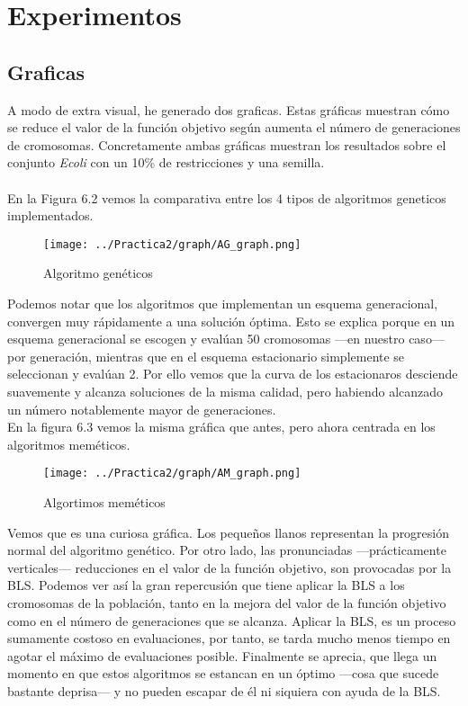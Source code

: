 \newpage

\section{Experimentos}
\subsection{Graficas}
A modo de extra visual, he generado dos graficas. Estas gráficas muestran cómo se reduce el valor de la función objetivo según aumenta el número de generaciones de cromosomas. Concretamente ambas gráficas muestran los resultados sobre el conjunto \emph{Ecoli} con un 10\% de restricciones y una semilla.\\
\\
En la Figura 6.2 vemos la comparativa entre los 4 tipos de algoritmos geneticos implementados.
\begin{figure}[H]
   \centering
   \texttt{[image: ../Practica2/graph/AG\_graph.png]}
   \caption{Algoritmo genéticos}
\end{figure}
Podemos notar que los algoritmos que implementan un esquema generacional, convergen muy rápidamente a una solución óptima. Esto se explica porque en un esquema generacional se escogen y evalúan 50 cromosomas ---en nuestro caso--- por generación, mientras que en el esquema estacionario simplemente se seleccionan y evalúan 2. Por ello vemos que la curva de los estacionaros desciende suavemente y alcanza soluciones de la misma calidad, pero habiendo alcanzado un número notablemente mayor de generaciones.\\
\newpage
En la figura 6.3 vemos la misma gráfica que antes, pero ahora centrada en los algoritmos meméticos.
\begin{figure}[H]
   \centering
   \texttt{[image: ../Practica2/graph/AM\_graph.png]}
   \caption{Algortimos meméticos}
\end{figure}

Vemos que es una curiosa gráfica. Los pequeños llanos representan la progresión normal del algoritmo genético. Por otro lado, las pronunciadas ---prácticamente verticales--- reducciones en el valor de la función objetivo, son provocadas por la BLS. Podemos ver así la gran repercusión que tiene aplicar la BLS a los cromosomas de la población, tanto en la mejora del valor de la función objetivo como en el número de generaciones que se alcanza. Aplicar la BLS, es un proceso sumamente costoso en evaluaciones, por tanto, se tarda mucho menos tiempo en agotar el máximo de evaluaciones posible. Finalmente se aprecia, que llega un momento en que estos algoritmos se estancan en un óptimo ---cosa que sucede bastante deprisa--- y no pueden escapar de él ni siquiera con ayuda de la BLS.

